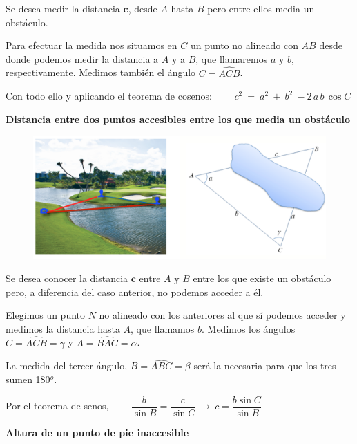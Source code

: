 Se desea medir la distancia $\boldsymbol c$, desde $A$ hasta $B$ pero entre ellos media un obstáculo.

Para efectuar la medida nos situamos en $C$ un punto no alineado con $\overline{AB}$ desde donde podemos medir la distancia a 
$A$ y a $B$, que llamaremos $a$ y $b$, respectivamente. Medimos también el ángulo $C=\widehat{ACB}$.

Con todo ello y aplicando el teorema de cosenos:
$\qquad c^2\ = \ a^2 \ + \ b^2\ - 2\, a\, b\, \cos C$


\vspace{8mm}
\begin{large}
\textbf{Distancia entre dos puntos accesibles entre los que media un obstáculo}	
\end{large}

\begin{figure}[H]
	\centering
	\includegraphics[width=.9\textwidth]{img-triang/topog02.png}
\end{figure}	


Se desea conocer la distancia $\boldsymbol c$ entre $A$ y $B$ entre los que existe un obstáculo pero, a diferencia del caso anterior, no podemos acceder a él.

Elegimos un punto $N$ no alineado con los anteriores al que sí podemos acceder y medimos la distancia hasta $A$, que llamamos $b$. Medimos los ángulos $C=\widehat{ACB}=\gamma$ y $A=\widehat{BAC}=\alpha$.

La medida del tercer ángulo, $B=\widehat{ABC}=\beta$ será la necesaria para que los tres sumen 180$^o$.

Por el teorema de senos, $\qquad \dfrac{b}{\sin B}=\dfrac{c}{\sin C} \ \to \ c=\dfrac{b\sin C}{\sin B}$


\vspace{8mm}
\begin{large}
\textbf{Altura de un punto de pie inaccesible}	
\end{large}

